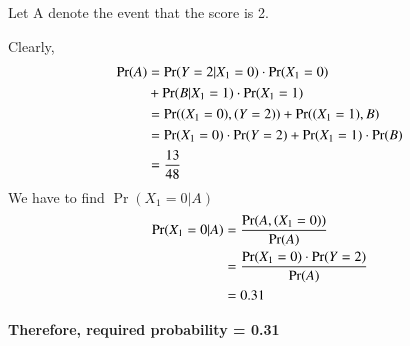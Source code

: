 Let A denote the event that the score is 2.

Clearly,
\begin{align}
\Pr(A)\nonumber&=\Pr(Y=2|X_1=0)\cdot \Pr(X_1=0) \\
    &+ \Pr(B|X_1=1)\cdot \Pr(X_1=1) 
\\[\parskip]
&=\Pr( (X_1=0),(Y=2) ) + \Pr( (X_1=1), B)
\\[\parskip]
&=\Pr(X_1=0)\cdot \Pr(Y=2)+ \Pr(X_1=1) \cdot \Pr(B)
\\[\parskip]
&=\dfrac{13}{48}
\end{align}
We have to find $\Pr(X_1=0|A)$
\begin{align}
\Pr(X_1=0|A)&=\dfrac{\Pr(A,(X_1=0) )}{\Pr(A)}
\\[\parskip]
&=\dfrac{\Pr(X_1=0)\cdot \Pr(Y=2)}{\Pr(A)}
\\[\parskip]
&=0.31
\end{align}

\textbf{Therefore, required probability = 0.31}

